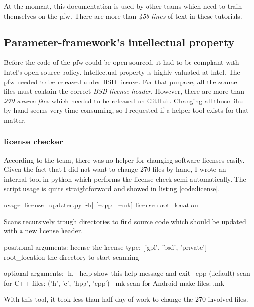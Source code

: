 At the moment, this documentation is used by other teams which need to train themselves on the \gls{pfw}.
There are more than \emph{450 lines} of text in these tutorials.


\subsection{Parameter-framework's intellectual property}
Before the code of the \gls{pfw} could be open-sourced, it had to be compliant with Intel's open-source policy.
Intellectual property is highly valuated at Intel. The \gls{pfw} needed to be released under
BSD license.
For that purpose, all the source files must contain the correct \emph{BSD license header}.
However, there are more than \emph{270 source files} which needed to be released on \gls{GitHub}.
Changing all those files by hand seems very time consuming, so I requested if a helper tool exists for that matter.

\subsubsection{license checker}
According to the team, there was no helper for changing software licenses easily.
Given the fact that I did not want to change 270 files by hand, I
wrote an internal tool in \gls{python} which performs the license check semi-automatically.
The script usage is quite straightforward and showed in listing \ref{code:license}.

\begin{code}[language=bash, caption=License checker usage, label=code:license]
usage: license_updater.py [-h] [--cpp | --mk] license root_location

Scans recursively trough directories to find source code which should be
updated with a new license header.

positional arguments:
    license        the license type: ['gpl', 'bsd', 'private']
    root_location  the directory to start scanning

optional arguments:
    -h, --help     show this help message and exit
    --cpp          (default) scan for C++ files: ('h', 'c', 'hpp', 'cpp')
    --mk           scan for Android make files: .mk
\end{code}

With this tool, it took less than half day of work to change the 270 involved files.


